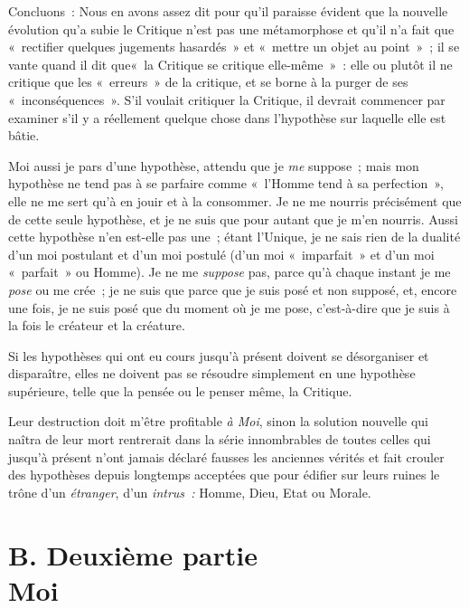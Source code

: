 \documentclass[french,twoside]{book} %
\begin{document}
Concluons : Nous en avons assez dit pour qu’il paraisse évident que la nouvelle évolution qu’a subie le Critique n’est pas une métamorphose et qu’il n’a fait que « rectifier quelques jugements hasardés » et « mettre un objet au point » ; il se vante quand il dit que« la Critique se critique elle-même » : elle ou plutôt il ne critique que les « erreurs » de la critique, et se borne à la purger de ses « inconséquences ». S’il voulait critiquer la Critique, il devrait commencer par examiner s’il y a réellement quelque chose dans l’hypothèse sur laquelle elle est bâtie.\par
Moi aussi je pars d’une hypothèse, attendu que je \emph{me} suppose ; mais mon hypothèse ne tend pas à se parfaire comme « l’Homme tend à sa perfection », elle ne me sert qu’à en jouir et à la consommer. Je ne me nourris précisément que de cette seule hypothèse, et je ne suis que pour autant que je m’en nourris. Aussi cette hypothèse n’en est-elle pas une ; étant l’Unique, je ne sais rien de la dualité d’un moi postulant et d’un moi postulé (d’un moi « imparfait » et d’un moi « parfait » ou Homme). Je ne me \emph{suppose} pas, parce qu’à chaque instant je me \emph{pose} ou me crée ; je ne suis que parce que je suis posé et non supposé, et, encore une fois, je ne suis posé que du moment où je me pose, c’est-à-dire que je suis à la fois le créateur et la créature.\par
Si les hypothèses qui ont eu cours jusqu’à présent doivent se désorganiser et disparaître, elles ne doivent pas se résoudre simplement en une hypothèse supérieure,  telle que la pensée ou le penser même, la Critique.\par
Leur destruction doit m’être profitable \emph{à Moi}, sinon la solution nouvelle qui naîtra de leur mort rentrerait dans la série innombrables de toutes celles qui jusqu’à présent n’ont jamais déclaré fausses les anciennes vérités et fait crouler des hypothèses depuis longtemps acceptées que pour édifier sur leurs ruines le trône d’un \emph{étranger}, d’un \emph{intrus :} Homme, Dieu, Etat ou Morale.
 \section[{B. Deuxième partie. Moi}]{B. Deuxième partie \\
Moi}\renewcommand{\leftmark}{B. Deuxième partie \\
Moi}

 \par
\end{document}
